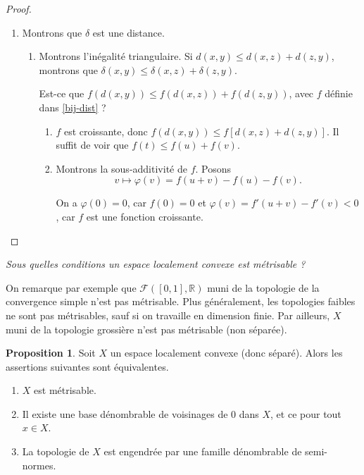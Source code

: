 \documentclass[french]{book}
\theoremstyle{definition}
\newtheorem{protoproposition}{Proposition}[section]
\newenvironment{prop}
    {\colorlet{shadecolor}{blue!5}\begin{shaded}\begin{protoproposition}}
    {\end{protoproposition}\end{shaded}}
\newcommand{\lesss}{<}
\newcommand{\less}{\lesss}
\begin{document}
\begin{proof}
\begin{enumerate}
    \item Montrons que $\delta$ est une distance.

    \begin{enumerate}
      \item Montrons l'inégalité triangulaire. Si $d(x,y) \leq d(x,z) + d(z,y)$, montrons que $\delta(x,y) \leq \delta(x,z) + \delta(z,y)$.

      Est-ce que \(f(d(x,y)) \leq f(d(x,z))+ f(d(z,y))\), avec \(f\) définie dans \ref{bij-dist} ?

      \begin{enumerate}
        \item $f$ est croissante, donc \(f(d(x,y)) \leq f[d(x,z) + d(z,y)]\). Il suffit de voir que $f(t) \leq f(u)+f(v)$.

        \item Montrons la sous-additivité de $f$. Posons \[v  \mapsto \varphi(v) =  f(u+v) - f(u) - f(v). \]

        On a \(\varphi(0) = 0\), car \(f(0) =0\) et \(\varphi(v) = f'(u+v) - f'(v) \less 0\), car $f$ est une fonction croissante.
      \end{enumerate}
    \end{enumerate}
  \end{enumerate}
\end{proof}

\emph{Sous quelles conditions un espace localement convexe est métrisable ?}

On remarque par exemple que $\mathscr{F}([0, 1], \mathbb{R})$ muni de la topologie de la convergence simple n'est pas métrisable. Plus généralement, les topologies faibles ne sont pas métrisables, sauf si on travaille en dimension finie. Par ailleurs, \(X\) muni de la topologie grossière n'est pas métrisable (non séparée).

\begin{prop}\label{elc-metr}
  Soit \(X\) un espace localement convexe (donc séparé). Alors les assertions suivantes sont équivalentes.

  \begin{enumerate}
    \item \(X\) est métrisable.
    \item Il existe une base dénombrable de voisinages de 0 dans \(X\), et ce pour tout \(x \in X\).
    \item La topologie de \(X\) est engendrée par une famille dénombrable de semi-normes.
  \end{enumerate}
\end{prop}
\end{document}
